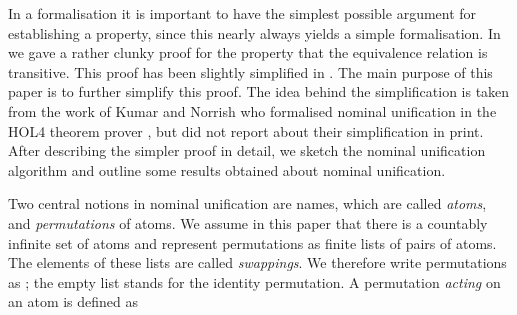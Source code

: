 \begin{isabellebody}
\begin{isamarkuptext}
  In a formalisation it is important to have the simplest possible argument
  for establishing a property, since this nearly always yields a simple
  formalisation. In \cite{UrbanPittsGabbay04} we gave a rather clunky proof
  for the property that the equivalence relation  is
  transitive. This proof has been slightly simplified in \cite{FernandezGabbay07}.  The main
  purpose of this paper is to further simplify this proof. The idea behind the
  simplification is taken from the work of Kumar and Norrish who formalised
  nominal unification in the HOL4 theorem prover \cite{KumarNorrish10}, but did
  not report about their simplification in print. After describing the simpler
  proof in detail, we sketch the nominal unification algorithm and outline
  some results obtained about nominal unification.\end{isamarkuptext}\isamarkuptrue {}
\isamarkuptrue \begin{isamarkuptext}Two central notions in nominal unification are names, which are called \emph{atoms}, and 
  \emph{permutations} of atoms.
  We assume in this paper that there is a countably infinite set of atoms and represent permutations
  as finite lists of pairs of atoms. The elements of these lists are called \emph{swappings}.
  We therefore write permutations as ; the empty list
   stands for the identity permutation. A permutation  {\it
  acting} on an atom  is defined as

  


\end{isamarkuptext}
\end{isabellebody}
